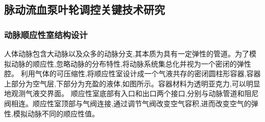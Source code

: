 \documentclass[titlepage,12pt]{article}
\begin{document}
\subsection{脉动流血泵叶轮调控关键技术研究}
\subsubsection{动脉顺应性室结构设计}
人体动脉包含大动脉以及众多的动脉分支,其本质为具有一定弹性的管道。为了模拟动脉的顺应性,忽略动脉的分布特性,将动脉系统集总化并视为一个密闭的弹性腔。
利用气体的可压缩性,将顺应性室设计成一个气液共存的密闭圆柱形容器,容器上部分为空气层,下部分为充盈的液体,如图所示。容器材料为透明亚克力,可以明显地观测气液交界面。
顺应性室底部有入口和出口两个接口,分别与动脉管道和阻尼阀相连。顺应性室顶部与气阀连接,通过调节气阀改变空气容积,进而改变空气的弹性,模拟动脉不同的顺应性值。
\end{document}

